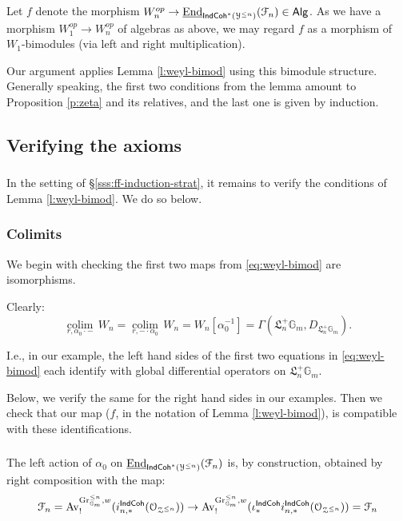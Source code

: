 \documentclass[reqno,11pt]{amsart}
\numberwithin{equation}{subsection}
\theoremstyle{remark}
\newcommand{\bG}{{\mathbb G}}
\newcommand{\sF}{{\EuScript F}}
\newcommand{\sO}{{\EuScript O}}
\newcommand{\sY}{{\EuScript Y}}
\newcommand{\sZ}{{\EuScript Z}}
\newcommand{\fL}{{\mathfrak L}}
\newcommand{\on}{\operatorname}
\newcommand{\ul}{\underline}
\newcommand{\End}{\on{End}}
\newcommand{\Gr}{\on{Gr}}
\newcommand{\colim}{\on{colim}}
\newcommand{\Av}{\on{Av}}
\newcommand{\IndCoh}{\mathsf{IndCoh}}
\newcommand{\Alg}{\mathsf{Alg}}
\begin{document}
Let $f$ denote the morphism $W_n^{op} \to \ul{\End}_{\IndCoh^*(\sY^{\leq n})}(\sF_n) \in \Alg$.
As we have a morphism $W_1^{op} \to W_n^{op}$ of algebras as above, we may regard $f$
as a morphism of $W_1$-bimodules (via left and right multiplication).

Our argument applies Lemma \ref{l:weyl-bimod} using this bimodule structure.
Generally speaking, the first two conditions from the lemma 
amount to Proposition \ref{p:zeta} and its relatives,
and the last one is given by induction.

\subsection{Verifying the axioms} %

\subsubsection{}

In the setting of \S \ref{sss:ff-induction-strat}, 
it remains to verify the conditions of Lemma \ref{l:weyl-bimod}.
We do so below. 

\subsubsection{Colimits}

We begin with checking the first two maps from \eqref{eq:weyl-bimod} are isomorphisms.

Clearly:
%
\[
\underset{r,\alpha_0\cdot-}{\colim} \, W_n = \underset{r,-\cdot \alpha_0}{\colim} \, W_n = W_n[\alpha_0^{-1}]
= \Gamma(\fL_n^+ \bG_m,D_{\fL_n^+ \bG_m}).
\]

\noindent I.e., in our example, the left hand sides of the first two equations in \eqref{eq:weyl-bimod}
each identify with global differential operators on $\fL_n^+ \bG_m$.

Below, we verify the same for the right hand sides in our examples. Then we check that our map ($f$, in the notation of Lemma \ref{l:weyl-bimod}), is compatible
with these identifications.

\subsubsection{}\label{sss:alpha-0-left}

The left action of $\alpha_0$ on $\ul{\End}_{\IndCoh^*(\sY^{\leq n})}(\sF_n)$ 
is, by construction, obtained by right composition with the map:
%
\[
\sF_n = 
\Av_!^{\Gr_{\bG_m}^{\leq n},w}(i_{n,*}^{\IndCoh}(\sO_{\sZ^{\leq n}})) \to 
\Av_!^{\Gr_{\bG_m}^{\leq n},w}(\iota_*^{\IndCoh}i_{n,*}^{\IndCoh}(\sO_{\sZ^{\leq n}})) = \sF_n
\]
\end{document}
